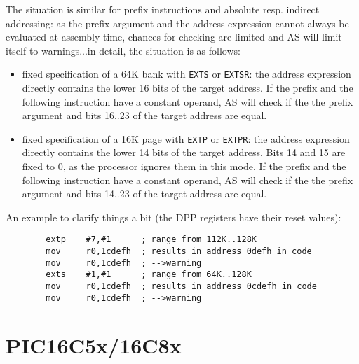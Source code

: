 \documentclass[12pt,twoside]{report}
\newcommand{\tty}[1]{{\tt #1}}
\newcommand{\asname}{{AS}}
\begin{document}
The situation is similar for prefix instructions and absolute resp.
indirect addressing: as the prefix argument and the address
expression cannot always be evaluated at assembly time, chances for
checking are limited and \asname{} will limit itself to warnings...in
detail, the situation is as follows:
\begin{itemize}
\item{fixed specification of a 64K bank with \tty{EXTS} or \tty{EXTSR}: the address
      expression directly contains the lower 16 bits of the target
      address.  If the prefix and the following instruction have a
      constant operand, \asname{} will check if the the prefix argument and bits
      16..23 of the target address are equal.}
\item{fixed specification of a 16K page with \tty{EXTP} or \tty{EXTPR}: the address
      expression directly contains the lower 14 bits of the target
      address.  Bits 14 and 15 are fixed to 0, as the processor ignores
      them in this mode.  If the prefix and the following instruction
      have a constant operand, \asname{} will check if the the prefix argument
      and bits 14..23 of the target address are equal.}
\end{itemize}
An example to clarify things a bit (the DPP registers have their
reset values):
\begin{verbatim}
        extp    #7,#1      ; range from 112K..128K
        mov     r0,1cdefh  ; results in address 0defh in code
        mov     r0,1cdefh  ; -->warning
        exts    #1,#1      ; range from 64K..128K
        mov     r0,1cdefh  ; results in address 0cdefh in code
        mov     r0,1cdefh  ; -->warning
\end{verbatim}


\section{PIC16C5x/16C8x}
\end{document}
